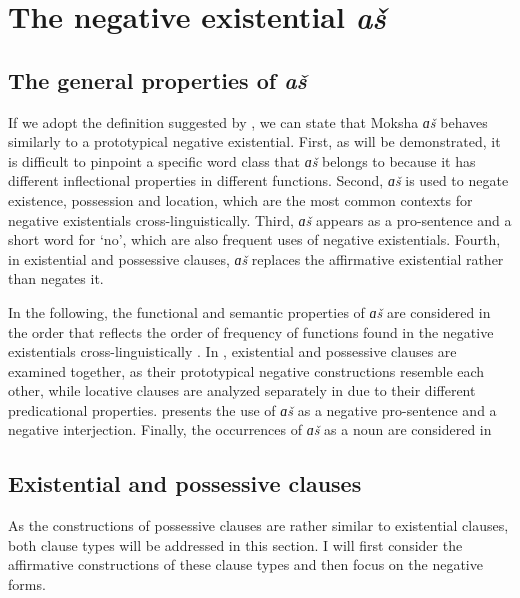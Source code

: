 \documentclass[output=paper]{langsci/langscibook}
\begin{document}
\section{The negative existential \textit{aš}}\label{sec:2:5}

\subsection{The general properties of \textit{aš}}\label{sec:2:5.1}

If we adopt the definition suggested by \citet[118--139]{Veselinova2013}, we can state that Moksha \textit{ɑš} behaves similarly to a prototypical negative existential. First, as will be demonstrated, it is difficult to pinpoint a specific word class that \textit{ɑš} belongs to because it has different inflectional properties in different functions. Second, \textit{ɑš} is used to negate existence, possession and location, which are the most common contexts for negative existentials cross-linguistically. Third, \textit{ɑš} appears as a pro-sentence and a short word for `no', which are also frequent uses of negative existentials. Fourth, in existential and possessive clauses, \textit{ɑš} replaces the affirmative existential rather than negates it.

  In the following, the functional and semantic properties of \textit{ɑš} are considered in the order that reflects the order of frequency of functions found in the negative existentials cross-linguistically \citep[118--119]{Veselinova2013}. In , existential and possessive clauses are examined together, as their prototypical negative constructions resemble each other, while locative clauses are analyzed separately in  due to their different predicational properties.  presents the use of \textit{ɑš} as a negative pro-sentence and a negative interjection. Finally, the occurrences of \textit{ɑš} as a noun are considered in 

\subsection{Existential and possessive clauses}\label{sec:2:5.2}

As the constructions of possessive clauses are rather similar to
existential clauses, both clause types will be addressed in this section. I
will first consider the affirmative constructions of these clause types and then focus on the negative forms.
\end{document}
